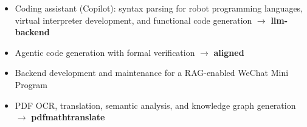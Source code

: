 \documentclass[../cv.tex]{subfiles}
\begin{document}
\begin{cventries}
{\begin{cvitems}
\begin{itemize}
				\item Coding assistant (Copilot): syntax parsing for robot programming languages, virtual interpreter development, and functional code generation $\rightarrow$ \textbf{llm-backend} \href{https://gitlab.com/siasunx1/llm-backend}{\faGitlab}
        \item Agentic code generation with formal verification $\rightarrow$ \textbf{aligned} \href{https://gitlab.com/Binjian/aligned}{\faGitlab}
				\item Backend development and maintenance for a RAG-enabled WeChat Mini Program
				\item PDF OCR, translation, semantic analysis, and knowledge graph generation $\rightarrow$ \textbf{pdfmathtranslate} \href{https://gitlab.com/siasunx1/pdfmathtranslate}{\faGitlab}
			\end{itemize}
		\end{cvitems}
	}



\end{cventries}
\end{document}
